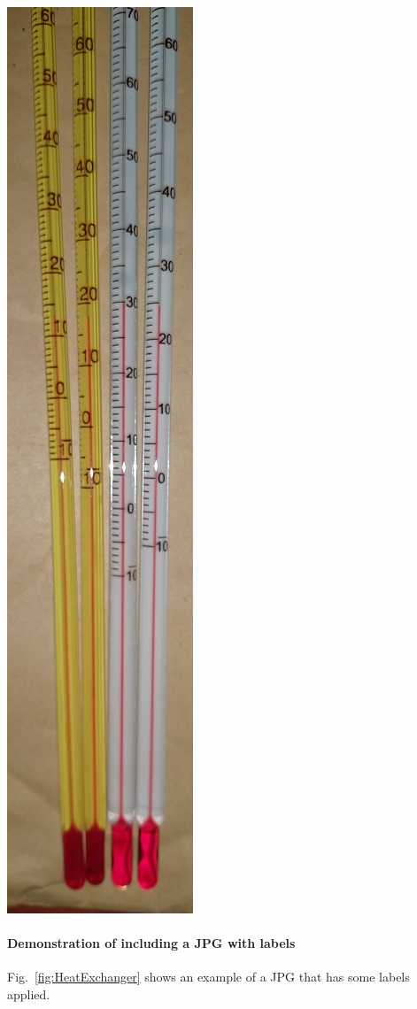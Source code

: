 \begin{center}%
\begin{minipage}{\columnwidth}%
	\centering
	\includegraphics[height=1\textwidth, angle=90]{600-Appendices/Examples/Thermometer.jpg}
	\label{fig:thermometer}	
\end{minipage}
\end{center}

\newpage

\paragraph{Demonstration of including a JPG with labels}
Fig.~\ref{fig:HeatExchanger} shows an example of a JPG that has some labels applied.

